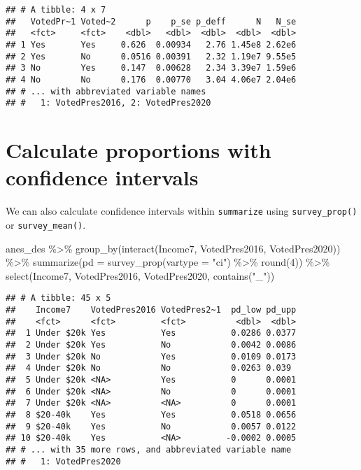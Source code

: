 \documentclass[
]{krantz}
\makeatletter
\newenvironment{Shaded}{\begin{snugshade}}{\end{snugshade}}
\newcommand{\AttributeTok}[1]{\textcolor[rgb]{0.61,0.61,0.61}{#1}}
\newcommand{\DecValTok}[1]{\textcolor[rgb]{0.06,0.06,0.06}{#1}}
\newcommand{\FunctionTok}[1]{\textcolor[rgb]{0,0,0}{#1}}
\newcommand{\NormalTok}[1]{#1}
\newcommand{\SpecialCharTok}[1]{\textcolor[rgb]{0,0,0}{#1}}
\newcommand{\StringTok}[1]{\textcolor[rgb]{0.5,0.5,0.5}{#1}}
\newenvironment{kframe}{%
\medskip{}
\setlength{\fboxsep}{.8em}
 \def\at@end@of@kframe{}%
 \ifinner\ifhmode%
  \def\at@end@of@kframe{\end{minipage}}%
  \begin{minipage}{\columnwidth}%
 \fi\fi%
 \def\FrameCommand##1{\hskip\@totalleftmargin \hskip-\fboxsep
 \colorbox{shadecolor}{##1}\hskip-\fboxsep
     \hskip-\linewidth \hskip-\@totalleftmargin \hskip\columnwidth}%
 \MakeFramed {\advance\hsize-\width
   \@totalleftmargin\z@ \linewidth\hsize
   \@setminipage}}%
 {\par\unskip\endMakeFramed%
 \at@end@of@kframe}
\renewenvironment{Shaded}{\begin{kframe}}{\end{kframe}}
\makeatother
\begin{document}
\begin{verbatim}
## # A tibble: 4 x 7
##   VotedPr~1 Voted~2      p    p_se p_deff      N   N_se
##   <fct>     <fct>    <dbl>   <dbl>  <dbl>  <dbl>  <dbl>
## 1 Yes       Yes     0.626  0.00934   2.76 1.45e8 2.62e6
## 2 Yes       No      0.0516 0.00391   2.32 1.19e7 9.55e5
## 3 No        Yes     0.147  0.00628   2.34 3.39e7 1.59e6
## 4 No        No      0.176  0.00770   3.04 4.06e7 2.04e6
## # ... with abbreviated variable names
## #   1: VotedPres2016, 2: VotedPres2020
\end{verbatim}

\hypertarget{calculate-proportions-with-confidence-intervals}{%
\section{Calculate proportions with confidence intervals}\label{calculate-proportions-with-confidence-intervals}}

We can also calculate confidence intervals within \texttt{summarize} using \texttt{survey\_prop()} or \texttt{survey\_mean()}.

\begin{Shaded}
\begin{Highlighting}[]
\NormalTok{anes\_des }\SpecialCharTok{\%\textgreater{}\%}
  \FunctionTok{group\_by}\NormalTok{(}\FunctionTok{interact}\NormalTok{(Income7, VotedPres2016, VotedPres2020)) }\SpecialCharTok{\%\textgreater{}\%}
  \FunctionTok{summarize}\NormalTok{(}\AttributeTok{pd =} \FunctionTok{survey\_prop}\NormalTok{(}\AttributeTok{vartype =} \StringTok{"ci"}\NormalTok{) }\SpecialCharTok{\%\textgreater{}\%} \FunctionTok{round}\NormalTok{(}\DecValTok{4}\NormalTok{)) }\SpecialCharTok{\%\textgreater{}\%}
  \FunctionTok{select}\NormalTok{(Income7, VotedPres2016, VotedPres2020, }\FunctionTok{contains}\NormalTok{(}\StringTok{"\_"}\NormalTok{))}
\end{Highlighting}
\end{Shaded}

\begin{verbatim}
## # A tibble: 45 x 5
##    Income7    VotedPres2016 VotedPres2~1  pd_low pd_upp
##    <fct>      <fct>         <fct>          <dbl>  <dbl>
##  1 Under $20k Yes           Yes           0.0286 0.0377
##  2 Under $20k Yes           No            0.0042 0.0086
##  3 Under $20k No            Yes           0.0109 0.0173
##  4 Under $20k No            No            0.0263 0.039 
##  5 Under $20k <NA>          Yes           0      0.0001
##  6 Under $20k <NA>          No            0      0.0001
##  7 Under $20k <NA>          <NA>          0      0.0001
##  8 $20-40k    Yes           Yes           0.0518 0.0656
##  9 $20-40k    Yes           No            0.0057 0.0122
## 10 $20-40k    Yes           <NA>         -0.0002 0.0005
## # ... with 35 more rows, and abbreviated variable name
## #   1: VotedPres2020
\end{verbatim}
\end{document}
